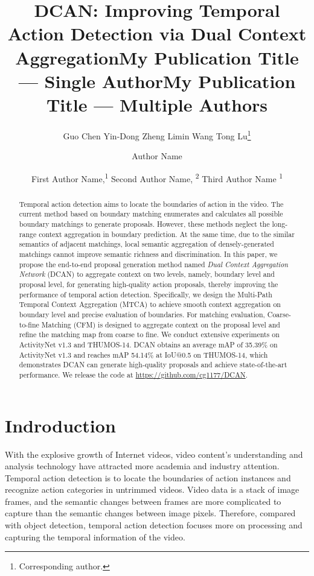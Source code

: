 \documentclass[letterpaper]{article} \usepackage{aaai22}  \usepackage{times}  \usepackage{helvet}  \usepackage{courier}  \usepackage[hyphens]{url}  \usepackage{graphicx} \urlstyle{rm} \def\UrlFont{\rm}  \usepackage{natbib}  \usepackage{caption} \DeclareCaptionStyle{ruled}{labelfont=normalfont,labelsep=colon,strut=off} \frenchspacing  \setlength{\pdfpagewidth}{8.5in}  \setlength{\pdfpageheight}{11in}  \usepackage{algorithm}
\title{DCAN: Improving Temporal Action Detection via Dual Context Aggregation}
\author{
Guo Chen\equalcontrib \quad
    Yin-Dong Zheng\equalcontrib \quad
    Limin Wang \quad
    Tong Lu\thanks{Corresponding author.}
}
\title{My Publication Title --- Single Author}
\author {
    Author Name
}
\title{My Publication Title --- Multiple Authors}
\author {
First Author Name,\textsuperscript{\rm 1}
    Second Author Name, \textsuperscript{\rm 2}
    Third Author Name \textsuperscript{\rm 1}
}
\begin{document}
\maketitle

\begin{abstract}
Temporal action detection aims to locate the boundaries of action in the video. 
The current method based on boundary matching enumerates and calculates all possible boundary matchings to generate proposals.
However, these methods neglect the long-range context aggregation in boundary prediction.
At the same time, due to the similar semantics of adjacent matchings, local semantic aggregation of densely-generated matchings cannot improve semantic richness and discrimination.
In this paper, we propose the end-to-end proposal generation method named {\em Dual Context Aggregation Network} (DCAN) to aggregate context on two levels, namely, boundary level and proposal level, for generating high-quality action proposals, thereby improving the performance of temporal action detection.
Specifically, we design the Multi-Path Temporal Context Aggregation (MTCA) to achieve smooth context aggregation on boundary level and precise evaluation of boundaries. 
For matching evaluation, Coarse-to-fine Matching (CFM) is designed to aggregate context on the proposal level and refine the matching map from coarse to fine. 
We conduct extensive experiments on ActivityNet v1.3 and THUMOS-14.
DCAN obtains an average mAP of 35.39\% on ActivityNet v1.3 and reaches mAP 54.14\% at IoU@0.5 on THUMOS-14, which demonstrates DCAN can generate high-quality proposals and achieve state-of-the-art performance.
We release the code at \url{https://github.com/cg1177/DCAN}.


\end{abstract}



\section{Indroduction}



With the explosive growth of Internet videos, video content's understanding and analysis technology have attracted more academia and industry attention.
Temporal action detection is to locate the boundaries of action instances and recognize action categories in untrimmed videos.
Video data is a stack of image frames, and the semantic changes between frames are more complicated to capture than the semantic changes between image pixels.
Therefore, compared with object detection, temporal action detection focuses more on processing and capturing the temporal information of the video. 
\end{document}
